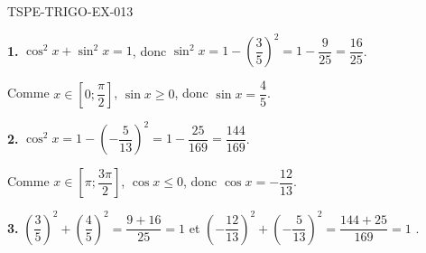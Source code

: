 \begin{corrige}{TSPE-TRIGO-EX-013}

\textbf{1.} $\cos^2 x + \sin^2 x = 1$, donc $\sin^2 x = 1 - \left(\dfrac{3}{5}\right)^2 = 1 - \dfrac{9}{25} = \dfrac{16}{25}$.

Comme $x \in \left[0;\dfrac{\pi}{2}\right]$, $\sin x \geqslant 0$, donc $\sin x = \dfrac{4}{5}$.

\textbf{2.} $\cos^2 x = 1 - \left(-\dfrac{5}{13}\right)^2 = 1 - \dfrac{25}{169} = \dfrac{144}{169}$.

Comme $x \in \left[\pi;\dfrac{3\pi}{2}\right]$, $\cos x \leqslant 0$, donc $\cos x = -\dfrac{12}{13}$.

\textbf{3.} $\left(\dfrac{3}{5}\right)^2 + \left(\dfrac{4}{5}\right)^2 = \dfrac{9+16}{25} = 1$ \checkmark \quad et \quad $\left(-\dfrac{12}{13}\right)^2 + \left(-\dfrac{5}{13}\right)^2 = \dfrac{144+25}{169} = 1$ \checkmark.

\end{corrige}
